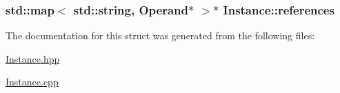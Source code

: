 \subsubsection[{\texorpdfstring{references}{references}}]{\setlength{\rightskip}{0pt plus 5cm}std\+::map$<$ std\+::string, {\bf Operand}$\ast$ $>$$\ast$ Instance\+::references}\hypertarget{struct_instance_a3262e6460c3b4fa873a3a439e77fdf7e}{}\label{struct_instance_a3262e6460c3b4fa873a3a439e77fdf7e}


The documentation for this struct was generated from the following files\+:\begin{DoxyCompactItemize}
\item 
\hyperlink{_instance_8hpp}{Instance.\+hpp}\item 
\hyperlink{_instance_8cpp}{Instance.\+cpp}\end{DoxyCompactItemize}
